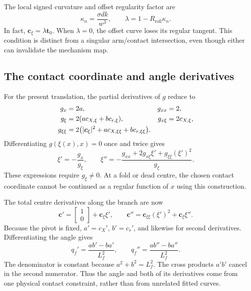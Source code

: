 \documentclass[11pt,letterpaper]{article}
\numberwithin{equation}{section}
\begin{document}
The local signed curvature and offset regularity factor are
\begin{equation}
  \kappa_n=\frac{\sigma d k}{w^3},
  \qquad \lambda=1-R_{\mathrm{roll}}\kappa_n.
  \label{eq:offset-regularity}
\end{equation}
In fact, $\bm c_{\xi}=\lambda\bm t_0$. When $\lambda=0$, the offset curve loses its regular tangent. This condition is distinct from a singular arm/contact intersection, even though either can invalidate the mechanism map.

\subsection{The contact coordinate and angle derivatives}

For the present translation, the partial derivatives of $g$ reduce to
\begin{align}
  g_x&=2a, & g_{xx}&=2,\notag\\
  g_{\xi}&=2(a c_{X,\xi}+b c_{r,\xi}),
       & g_{x\xi}&=2c_{X,\xi},\label{eq:g-partials}\\
  g_{\xi\xi}&=2\bigl(|\bm c_{\xi}|^2
                        +a c_{X,\xi\xi}+b c_{r,\xi\xi}\bigr).\notag
\end{align}
Differentiating $g(\xi(x),x)=0$ once and twice gives
\begin{equation}
  \xi'=-\frac{g_x}{g_{\xi}},
  \qquad
  \xi''=-\frac{g_{xx}+2g_{x\xi}\xi'+g_{\xi\xi}(\xi')^2}{g_{\xi}}.
  \label{eq:xi-derivatives}
\end{equation}
These expressions require $g_{\xi}\ne0$. At a fold or dead centre, the chosen contact coordinate cannot be continued as a regular function of $x$ using this construction.

The total centre derivatives along the branch are now
\begin{equation}
  \bm c'=\begin{bmatrix}1\\0\end{bmatrix}+\bm c_{\xi}\xi',
  \qquad
  \bm c''=\bm c_{\xi\xi}(\xi')^2+\bm c_{\xi}\xi''.
  \label{eq:center-total}
\end{equation}
Because the pivot is fixed, $a'=c_X'$, $b'=c_r'$, and likewise for second derivatives. Differentiating the angle gives
\begin{equation}
  \boxed{q_f'=\frac{ab'-ba'}{L_f^2},\qquad
         q_f''=\frac{ab''-ba''}{L_f^2}.}
  \label{eq:q-derivatives}
\end{equation}
The denominator is constant because $a^2+b^2=L_f^2$. The cross products $a'b'$ cancel in the second numerator. Thus the angle and both of its derivatives come from one physical contact constraint, rather than from unrelated fitted curves.
\end{document}
